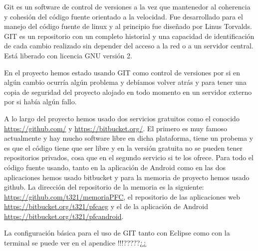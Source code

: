 Git es un software de control de versiones a la vez que mantenedor al coherencia y cohesión del código fuente orientado a la velocidad. Fue desarrollado para el manejo del código fuente de linux y al principio fue diseñado por Linus Torvalds. GIT es un repositorio con un completo historial y una capacidad de identificación de cada cambio realizado sin depender del acceso a la red o a un servidor central. Está liberado con licencia GNU versión 2.

En el proyecto hemos estado usando GIT como control de versiones por si en algún cambio ocurría algún problema y debíamos volver atrás y para tener una copia de seguridad del proyecto alojado en todo momento en un servidor externo por si había algún fallo.

A lo largo del proyecto hemos usado dos servicios gratuitos como el conocido \url{https://github.com/} y \url{https://bitbucket.org/}. El primero es muy famoso actualmente y hay mucho software libre en dicha plataforma, tiene un probema y es que el código tiene que ser libre y en la versión gratuita no se pueden tener repositorios privados, cosa que en el segundo servicio si te los ofrece. Para todo el código fuente usando, tanto en la aplicación de Android como en las dos aplicaciones hemos usado bitbucket y para la memoria de proyecto hemos usado github. La dirección del repositorio de la memoria es la siguiente: \url{https://github.com/t321/memoriaPFC}, el repositorio de las aplicaciones web \url{https://bitbucket.org/t321/pfcaeg} y el de la aplicación de Android \url{https://bitbucket.org/t321/pfcandroid}.

La configuración básica para el uso de GIT tanto con Eclipse como con la terminal se puede ver en el apendice !!!?????¿¿  














